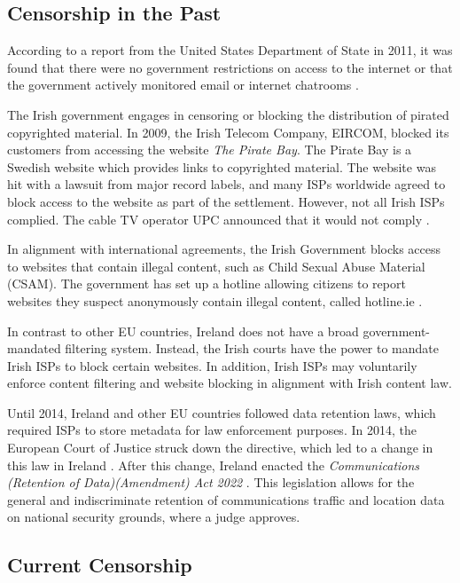 \subsection{Censorship in the Past}

According to a report from the United States Department of State in 2011, it was found that there were no government restrictions on access to the internet or that the government actively monitored email or internet chatrooms \cite{stateTechnicalDifficulties}.

The Irish government engages in censoring or blocking the distribution of pirated copyrighted material. In 2009, the Irish Telecom Company, EIRCOM, blocked its customers from accessing the website \textit{The Pirate Bay}. The Pirate Bay is a Swedish website which provides links to copyrighted material. The website was hit with a lawsuit from major record labels, and many ISPs worldwide agreed to block access to the website as part of the settlement. However, not all Irish ISPs complied. The cable TV operator UPC announced that it would not comply \cite{irishtimesEircomBlock}. 

In alignment with international agreements, the Irish Government blocks access to websites that contain illegal content, such as Child Sexual Abuse Material (CSAM). The government has set up a hotline allowing citizens to report websites they suspect anonymously contain illegal content, called hotline.ie \cite{hotlineAboutx2013}.

In contrast to other EU countries, Ireland does not have a broad government-mandated filtering system. Instead, the Irish courts have the power to mandate Irish ISPs to block certain websites. In addition, Irish ISPs may voluntarily enforce content filtering and website blocking in alignment with Irish content law.

Until 2014, Ireland and other EU countries followed data retention laws, which required ISPs to store metadata for law enforcement purposes. In 2014, the European Court of Justice struck down the directive, which led to a change in this law in Ireland \cite{DataRetentionInvalid2014}. After this change, Ireland enacted the \textit{Communications (Retention of Data)(Amendment) Act 2022} \cite{irishlegalDataRetention}. This legislation allows for the general and indiscriminate retention of communications traffic and location data on national security grounds, where a judge approves.

\subsection{Current Censorship}
\label{sec:Ireland-Current-Censorship}

